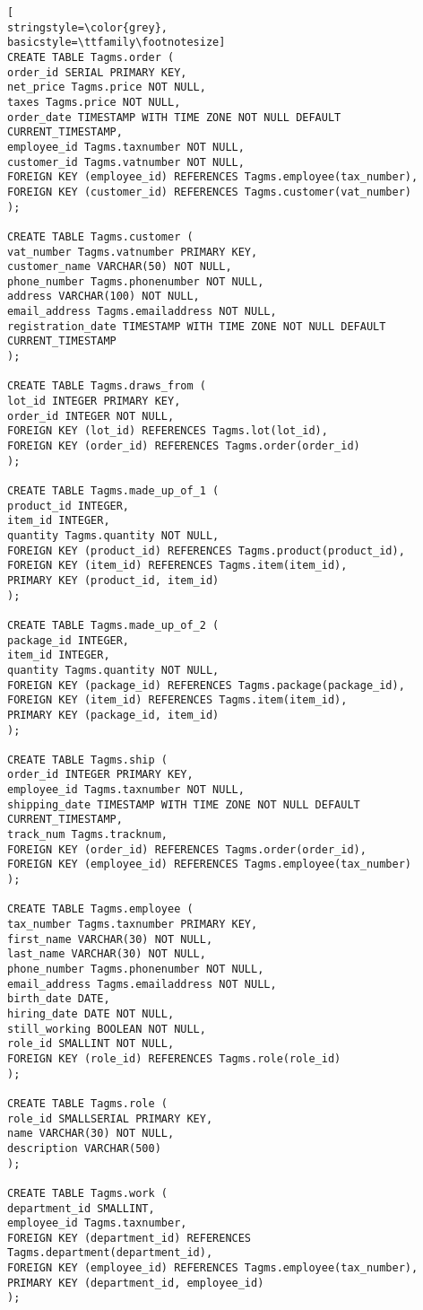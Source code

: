 \begin{lstlisting}[
stringstyle=\color{grey},
basicstyle=\ttfamily\footnotesize]
CREATE TABLE Tagms.order (
order_id SERIAL PRIMARY KEY,
net_price Tagms.price NOT NULL,
taxes Tagms.price NOT NULL,
order_date TIMESTAMP WITH TIME ZONE NOT NULL DEFAULT CURRENT_TIMESTAMP,
employee_id Tagms.taxnumber NOT NULL,
customer_id Tagms.vatnumber NOT NULL,
FOREIGN KEY (employee_id) REFERENCES Tagms.employee(tax_number),
FOREIGN KEY (customer_id) REFERENCES Tagms.customer(vat_number)
);

CREATE TABLE Tagms.customer (
vat_number Tagms.vatnumber PRIMARY KEY,
customer_name VARCHAR(50) NOT NULL,
phone_number Tagms.phonenumber NOT NULL,
address VARCHAR(100) NOT NULL,
email_address Tagms.emailaddress NOT NULL,
registration_date TIMESTAMP WITH TIME ZONE NOT NULL DEFAULT CURRENT_TIMESTAMP
);

CREATE TABLE Tagms.draws_from (
lot_id INTEGER PRIMARY KEY,
order_id INTEGER NOT NULL,
FOREIGN KEY (lot_id) REFERENCES Tagms.lot(lot_id),
FOREIGN KEY (order_id) REFERENCES Tagms.order(order_id)
);

CREATE TABLE Tagms.made_up_of_1 (
product_id INTEGER,
item_id INTEGER,
quantity Tagms.quantity NOT NULL,
FOREIGN KEY (product_id) REFERENCES Tagms.product(product_id),
FOREIGN KEY (item_id) REFERENCES Tagms.item(item_id),
PRIMARY KEY (product_id, item_id)
);

CREATE TABLE Tagms.made_up_of_2 (
package_id INTEGER,
item_id INTEGER,
quantity Tagms.quantity NOT NULL,
FOREIGN KEY (package_id) REFERENCES Tagms.package(package_id),
FOREIGN KEY (item_id) REFERENCES Tagms.item(item_id),
PRIMARY KEY (package_id, item_id)
);

CREATE TABLE Tagms.ship (
order_id INTEGER PRIMARY KEY,
employee_id Tagms.taxnumber NOT NULL,
shipping_date TIMESTAMP WITH TIME ZONE NOT NULL DEFAULT CURRENT_TIMESTAMP,
track_num Tagms.tracknum,
FOREIGN KEY (order_id) REFERENCES Tagms.order(order_id),
FOREIGN KEY (employee_id) REFERENCES Tagms.employee(tax_number)
);

CREATE TABLE Tagms.employee (
tax_number Tagms.taxnumber PRIMARY KEY,
first_name VARCHAR(30) NOT NULL,
last_name VARCHAR(30) NOT NULL,
phone_number Tagms.phonenumber NOT NULL,
email_address Tagms.emailaddress NOT NULL,
birth_date DATE,
hiring_date DATE NOT NULL,
still_working BOOLEAN NOT NULL,
role_id SMALLINT NOT NULL,
FOREIGN KEY (role_id) REFERENCES Tagms.role(role_id)
);

CREATE TABLE Tagms.role (
role_id SMALLSERIAL PRIMARY KEY,
name VARCHAR(30) NOT NULL,
description VARCHAR(500)
);

CREATE TABLE Tagms.work (
department_id SMALLINT,
employee_id Tagms.taxnumber,
FOREIGN KEY (department_id) REFERENCES Tagms.department(department_id),
FOREIGN KEY (employee_id) REFERENCES Tagms.employee(tax_number),
PRIMARY KEY (department_id, employee_id)
);


\end{lstlisting}
